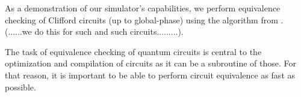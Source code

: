 \documentclass[runningheads]{llncs}
\begin{document}
As a demonstration of our simulator's capabilities, we perform equivalence checking of Clifford circuits (up to global-phase)  using the algorithm from \cite{EC}. (......we do this for such and such circuits.........). 

The task of equivalence checking of quantum circuits is central to the optimization and compilation of circuits as it can be a subroutine of those. For that reason, it is important to be able to perform circuit equivalence as fast as possible. 







	
	
	
\end{document}
